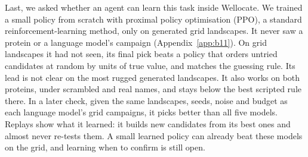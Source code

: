 Last, we asked whether an agent can learn this task inside Wellocate. We trained a small policy from scratch with proximal policy optimisation (PPO), a standard reinforcement-learning method,
only on generated grid landscapes. It never saw a protein or a language model's campaign (Appendix~\ref{app:b11}).
On grid landscapes it had not seen, its final pick beats a policy that orders untried candidates at random by
\nPolRandGrid{} units of true value, and matches the guessing rule. Its lead is not clear on the most rugged generated landscapes. It also works on both proteins, under scrambled and
real names, and stays below the best scripted rule there. In a later check, given the same landscapes, seeds, noise and budget as
each language model's grid campaigns, it picks better than all five models. Replays show what it learned: it builds new
candidates from its best ones and almost never re-tests them. A small learned policy can already beat these models on the
grid, and learning when to confirm is still open.

